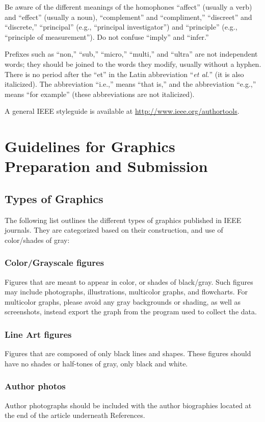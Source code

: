 \documentclass{ieeeaccess}
\begin{document}
Be aware of the different meanings of the homophones ``affect'' (usually a
verb) and ``effect'' (usually a noun), ``complement'' and ``compliment,''
``discreet'' and ``discrete,'' ``principal'' (e.g., ``principal
investigator'') and ``principle'' (e.g., ``principle of measurement''). Do
not confuse ``imply'' and ``infer.''

Prefixes such as ``non,'' ``sub,'' ``micro,'' ``multi,'' and ``ultra'' are
not independent words; they should be joined to the words they modify,
usually without a hyphen. There is no period after the ``et'' in the Latin
abbreviation ``\emph{et al.}'' (it is also italicized). The abbreviation ``i.e.,'' means
``that is,'' and the abbreviation ``e.g.,'' means ``for example'' (these
abbreviations are not italicized).

A general IEEE styleguide is available at \break
\underline{http://www.ieee.org/authortools}.

\section{Guidelines for Graphics Preparation and Submission}
\label{sec:guidelines}

\subsection{Types of Graphics}
The following list outlines the different types of graphics published in
IEEE journals. They are categorized based on their construction, and use of
color/shades of gray:

\subsubsection{Color/Grayscale figures}
{Figures that are meant to appear in color, or shades of black/gray. Such
figures may include photographs, illustrations, multicolor graphs, and
flowcharts. For multicolor graphs, please avoid any gray backgrounds or shading, as well as screenshots, instead export the graph from the program used to collect the data.}

\subsubsection{Line Art figures}
{Figures that are composed of only black lines and shapes. These figures
should have no shades or half-tones of gray, only black and white.}

\subsubsection{Author photos}
{Author photographs should be included with the author biographies located at the end of the article underneath References. }
\end{document}
